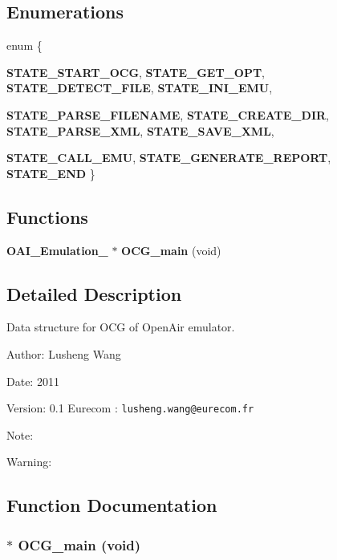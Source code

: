 \subsection*{Enumerations}
\begin{CompactItemize}
\item 
enum \{ \par
{\bf STATE\_\-START\_\-OCG}, 
{\bf STATE\_\-GET\_\-OPT}, 
{\bf STATE\_\-DETECT\_\-FILE}, 
{\bf STATE\_\-INI\_\-EMU}, 
\par
{\bf STATE\_\-PARSE\_\-FILENAME}, 
{\bf STATE\_\-CREATE\_\-DIR}, 
{\bf STATE\_\-PARSE\_\-XML}, 
{\bf STATE\_\-SAVE\_\-XML}, 
\par
{\bf STATE\_\-CALL\_\-EMU}, 
{\bf STATE\_\-GENERATE\_\-REPORT}, 
{\bf STATE\_\-END}
 \}
\end{CompactItemize}
\subsection*{Functions}
\begin{CompactItemize}
\item 
{\bf OAI\_\-Emulation\_\-} $\ast$ {\bf OCG\_\-main} (void)
\end{CompactItemize}


\subsection{Detailed Description}
Data structure for OCG of OpenAir emulator. 

\begin{Desc}
\item[Author:]Lusheng Wang \end{Desc}
\begin{Desc}
\item[Date:]2011 \end{Desc}
\begin{Desc}
\item[Version:]0.1  Eurecom : {\tt lusheng.wang@eurecom.fr} \end{Desc}
\begin{Desc}
\item[Note:]\end{Desc}
\begin{Desc}
\item[Warning:]\end{Desc}


\subsection{Function Documentation}
\subsubsection[{OCG\_\-main}]{$\ast$ OCG\_\-main (void)}\label{OCG_8h_ab0460b1df858b12025dee8bc78056a5}


